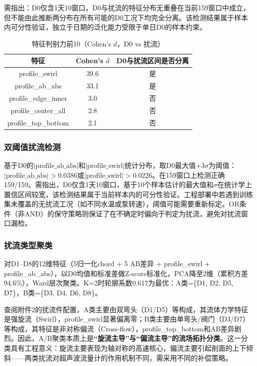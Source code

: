 需指出：D0仅含1天10窗口，D0与扰流的特征分布无重叠在当前159窗口中成立，但不能由此推断两分布在所有可能的D0工况下均完全分离。该检测结果属于样本内可分性验证，独立于日期的泛化能力受限于单日D0的样本约束。

\begin{table}[H]
\centering
\caption{特征判别力前10（Cohen's $d$，D0 vs 扰流）}
\label{tab:q3_cohens_d}
\begin{tabular}{ccc}
\toprule
特征 & Cohen's $d$ & D0与扰流区间是否分离 \\
\midrule
profile\_swirl & 39.6 & 是 \\
profile\_ab\_abs & 33.1 & 是 \\
profile\_edge\_inner & 3.0 & 否 \\
profile\_center\_all & 2.8 & 否 \\
profile\_top\_bottom & 2.1 & 否 \\
\bottomrule
\end{tabular}
\end{table}

\subsubsection{双阈值扰流检测}

基于D0的$|\text{profile\_ab\_abs}|$和$|\text{profile\_swirl}|$统计分布，取D0最大值$+3\sigma$为阈值：$|\text{profile\_ab\_abs}| > 0.0386$或$|\text{profile\_swirl}| > 0.0226$。在159窗口上检测正确159/159。需指出，D0仅含1天10窗口，基于10个样本估计的最大值和$\sigma$在统计学上置信区间较宽，该检测结果属于当前样本内的可分性验证。工程部署中若遇到训练集未覆盖的无扰流工况（如不同水温或泵转速），阈值可能需要重新标定。OR条件（非AND）的保守策略则保证了在不确定时偏向于判定为扰流，避免对扰流窗口漏检。

\subsubsection{扰流类型聚类}

对D1--D8的12维特征（5归一化chord + 5 AB差异 + profile\_swirl + profile\_ab\_abs），以D0均值和标准差做Z-score标准化，PCA降至2维（累积方差94.6\%），Ward层次聚类。K=2时轮廓系数0.617为最优：A类=\{D1, D2, D5, D7\}，B类=\{D3, D4, D6, D8\}。

查阅附件2的扰流件配置，A类主要由双弯头（D1/D5）等构成，其流体力学特征是强旋流（Swirl），profile\_swirl显著偏离零；B类主要由单弯头/阀门（D3/D7）等构成，其特征是非对称偏流（Cross-flow），profile\_top\_bottom和AB差异剧烈。因此，A/B聚类本质上是\textbf{“旋流主导”与“偏流主导”的流场拓扑分类}。这一分类具有工程意义：旋流主要表现为轴对称的高速核心，偏流主要引起剖面的上下倾斜——两类扰流对超声波流量计的作用机制不同，需采用不同的补偿策略。

